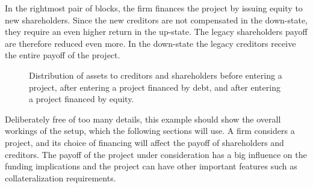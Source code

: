 \documentclass[main.tex]{subfiles}
\begin{document}
\begin{example}
    In the rightmost pair of blocks,
    the firm finances the project by issuing equity to new shareholders.
    Since the new creditors are not compensated in the down-state,
    they require an even higher return in the up-state.
    The legacy shareholders payoff are therefore reduced even more.
    In the down-state the legacy creditors receive the entire payoff of the project.
    

    \end{example}

    \begin{figure}
        \centering
        \resizebox{\textwidth}{!}{%
        \begin{tikzpicture}
            
        \end{tikzpicture}        
        }   
        \caption{
            Distribution of assets to creditors and shareholders before entering a project,
            after entering a project financed by debt, 
            and after entering a project financed by equity.
        }
        \label{fig:funding-examples}
    \end{figure}

    Deliberately free of too many details, 
    this example should show the overall workings of the setup, 
    which the following sections will use.
    A firm considers a project, 
    and its choice of financing will affect the payoff of shareholders and creditors.
    The payoff of the project under consideration has a big influence on the funding implications
    and the project can have other important features such as collateralization requirements.
\end{document}
